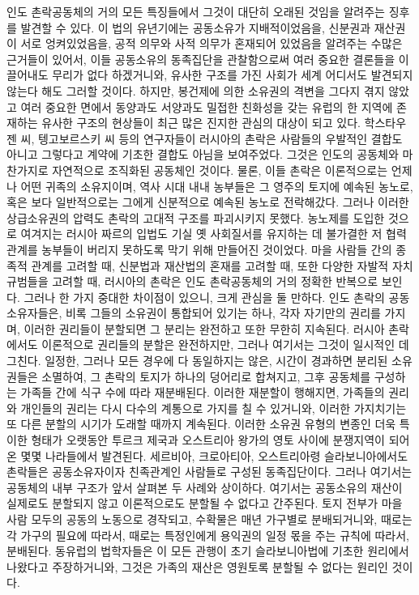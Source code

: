 인도 촌락공동체의 거의 모든 특징들에서
그것이 대단히 오래된 것임을 알려주는 징후를 발견할 수 있다.
이 법의 유년기에는 공동소유가 지배적이었음을,
신분권과 재산권이 서로 엉켜있었음을,
공적 의무와 사적 의무가 혼재되어 있었음을 알려주는
수많은 근거들이 있어서,
이들 공동소유의 동족집단을 관찰함으로써 여러 중요한 결론들을
이끌어내도 무리가 없다 하겠거니와,
유사한 구조를 가진 사회가 세계 어디서도 발견되지 않는다 해도 그러할 것이다.
하지만,
봉건제에 의한 소유권의 격변을 그다지 겪지 않았고
여러 중요한 면에서 동양과도 서양과도 밀접한 친화성을 갖는
유럽의 한 지역에 존재하는 유사한 구조의 현상들이
최근 많은 진지한 관심의 대상이 되고 있다.
학스타우젠 씨,
텡고보르스키 씨 등의 연구자들이
러시아의 촌락은 사람들의 우발적인 결합도 아니고
그렇다고 계약에 기초한 결합도 아님을 보여주었다.
그것은 인도의 공동체와 마찬가지로 자연적으로 조직화된 공동체인 것이다.
물론,
이들 촌락은 이론적으로는 언제나 어떤 귀족의 소유지이며,
역사 시대 내내
농부들은
그 영주의 토지에 예속된 농노로,
혹은 보다 일반적으로는
그에게 신분적으로 예속된 농노로 전락해갔다.
그러나
이러한 상급소유권의 압력도
촌락의 고대적 구조를 파괴시키지 못했다.
농노제를 도입한 것으로 여겨지는 러시아 짜르의 입법도
기실 옛 사회질서를 유지하는 데 불가결한 저 협력관계를
농부들이 버리지 못하도록 막기 위해 만들어진 것이었다.
마을 사람들 간의 종족적 관계를 고려할 때,
신분법과 재산법의 혼재를 고려할 때,
또한 다양한 자발적 자치규범들을 고려할 때,
러시아의 촌락은 인도 촌락공동체의 거의 정확한 반복으로 보인다.
그러나 한 가지 중대한 차이점이 있으니,
크게 관심을 둘 만하다.
인도 촌락의 공동소유자들은,
비록 그들의 소유권이 통합되어 있기는 하나,
각자 자기만의 권리를 가지며,
이러한 권리들이 분할되면 그 분리는 완전하고 또한 무한히 지속된다.
러시아 촌락에서도 이론적으로 권리들의 분할은 완전하지만,
그러나 여기서는 그것이 일시적인 데 그친다.
일정한, 그러나 모든 경우에 다 동일하지는 않은,
시간이 경과하면
분리된 소유권들은 소멸하여,
그 촌락의 토지가 하나의 덩어리로 합쳐지고, 그후
공동체를 구성하는 가족들 간에 식구 수에 따라 재분배된다.
이러한 재분할이 행해지면,
가족들의 권리와 개인들의 권리는 다시
다수의 계통으로 가지를 칠 수 있거니와,
이러한 가지치기는 또 다른 분할의 시기가 도래할 때까지 계속된다.
이러한 소유권 유형의 변종인 더욱 특이한 형태가
오랫동안
투르크 제국과 오스트리아 왕가의 영토 사이에 분쟁지역이 되어온
몇몇 나라들에서 발견된다.
세르비아, 크로아티아, 오스트리아령 슬라보니아에서도
촌락들은 공동소유자이자 친족관계인 사람들로 구성된 동족집단이다.
그러나 여기서는 공동체의 내부 구조가
앞서 살펴본 두 사례와 상이하다.
여기서는 공동소유의 재산이 실제로도 분할되지 않고
이론적으로도 분할될 수 없다고 간주된다.
토지 전부가 마을 사람 모두의 공동의 노동으로 경작되고,
수확물은 매년 가구별로 분배되거니와,
때로는 각 가구의 필요에 따라서,
때로는 특정인에게 용익권의 일정 몫을 주는 규칙에 따라서,
분배된다.
동유럽의 법학자들은 이 모든 관행이
초기 슬라보니아법에 기초한 원리에서 나왔다고 주장하거니와,
그것은 가족의 재산은 영원토록 분할될 수 없다는 원리인 것이다.

